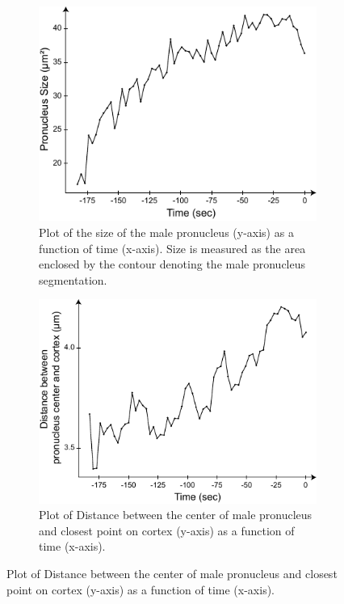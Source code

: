 \begin{figure}[p]
\begin{subfigure}[t]{0.45\textwidth}
    \centering
    \includegraphics[width=\textwidth]{ExpMethods/FigTrackNucleus/sizeVsTime.pdf}
    \caption{Plot of the size of the male pronucleus (y-axis) as a function of time (x-axis). Size is measured as the area enclosed by the contour denoting the male pronucleus segmentation.} 
    \label{subfig:malePronucleusTrackingResults-sizeVsTime}
\end{subfigure}
\hfill
\begin{subfigure}[t]{0.45\textwidth}
    \centering
    \includegraphics[width=\textwidth]{ExpMethods/FigTrackNucleus/crtxDistVsTime.pdf}
    \caption{Plot of Distance between the center of male pronucleus and closest point on cortex (y-axis) as a function of time (x-axis).} 
    \label{subfig:malePronucleusTrackingResults-crtxDistVsTime}
\end{subfigure}


\end{figure}
